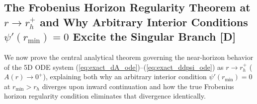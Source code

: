 \documentclass[11pt,a4paper]{article}
\newcommand{\catD}{\textbf{\textcolor{blue!75!black}{[D]}}}
\theoremstyle{definition}
\theoremstyle{remark}
\begin{document}
\subsection{\texorpdfstring{The Frobenius Horizon Regularity Theorem at $r \to r_h^+$ and Why Arbitrary Interior Conditions $\psi'(r_{\min}) = 0$ Excite the Singular Branch \catD}{The Frobenius Horizon Regularity Theorem at r -> r_h+ and Why Arbitrary Interior Conditions Excite the Singular Branch}}

We now prove the central analytical theorem governing the near-horizon behavior of the 5D ODE system (\ref{eq:exact_dA_ode})--(\ref{eq:exact_ddpsi_ode}) as $r \to r_h^+$ ($A(r) \to 0^+$), explaining both why an arbitrary interior condition $\psi'(r_{\min}) = 0$ at $r_{\min} > r_h$ diverges upon inward continuation and how the true Frobenius horizon regularity condition eliminates that divergence identically.
\end{document}
